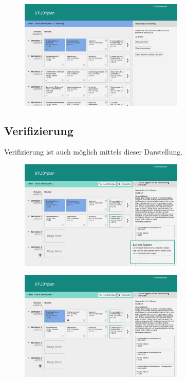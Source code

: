 \begin{figure}[!htb]
	\caption{}
	\label{fig:gui-generierung-4}
	\centering
	\includegraphics[width=0.7\textwidth]{../GUI/ergebnisse/generierung-4.png}
\end{figure}

\subsection{Verifizierung}
Verifizierung ist auch möglich mittels dieser Darstellung.
\begin{figure}[!htb]
	\caption{}
	\label{fig:gui-verifizierung-1}
	\centering
	\includegraphics[width=0.7\textwidth]{../GUI/ergebnisse/verifizierung-1.png}
\end{figure}
\begin{figure}[!htb]
	\caption{}
	\label{fig:gui-verifizierung-2}
	\centering
	\includegraphics[width=0.7\textwidth]{../GUI/ergebnisse/verifizierung-2.png}
\end{figure}

